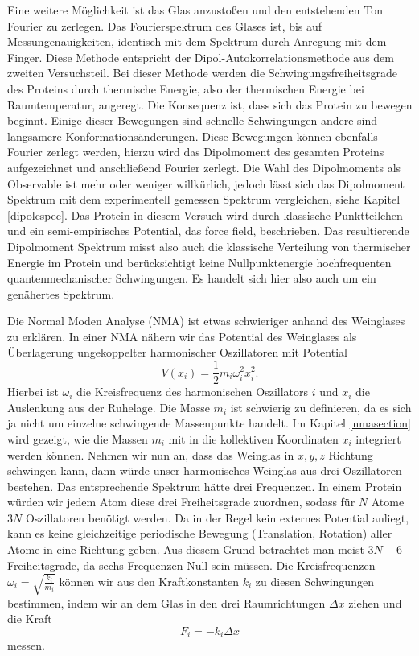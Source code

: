 \documentclass[a4paper,12pt]{article}
\begin{document}
Eine weitere Möglichkeit ist das Glas anzustoßen und den entstehenden Ton Fourier zu zerlegen. Das Fourierspektrum des Glases ist, bis auf 
Messungenauigkeiten, identisch mit dem Spektrum durch Anregung mit dem Finger. Diese Methode entspricht der Dipol-Autokorrelationsmethode aus 
dem zweiten Versuchsteil. Bei dieser Methode werden die Schwingungsfreiheitsgrade des Proteins durch thermische Energie, also der thermischen 
Energie bei Raumtemperatur, angeregt. Die Konsequenz ist, dass sich das Protein zu bewegen beginnt. Einige dieser Bewegungen sind schnelle Schwingungen 
andere sind langsamere Konformationsänderungen. Diese Bewegungen können ebenfalls Fourier zerlegt werden, hierzu wird das Dipolmoment des gesamten Proteins 
aufgezeichnet und anschließend Fourier zerlegt. Die Wahl des Dipolmoments als Observable ist mehr oder weniger willkürlich, jedoch lässt sich 
das Dipolmoment Spektrum mit dem experimentell gemessen Spektrum vergleichen, siehe Kapitel \ref{dipolespec}. Das Protein in diesem Versuch 
wird durch klassische Punktteilchen und ein semi-empirisches Potential, das force field, beschrieben. Das resultierende Dipolmoment Spektrum misst also
auch die klassische Verteilung von thermischer Energie im Protein und berücksichtigt keine Nullpunktenergie hochfrequenten quantenmechanischer 
Schwingungen. Es handelt sich hier also auch um ein genähertes Spektrum.


Die Normal Moden Analyse (NMA) ist etwas schwieriger anhand des Weinglases zu erklären. In einer NMA nähern wir das Potential des Weinglases als Überlagerung
ungekoppelter harmonischer Oszillatoren mit Potential
\begin{equation}
 V(x_i)=\frac{1}{2} m_i \omega_i^2 x_i^2.
\end{equation}
Hierbei ist $\omega_i$ die Kreisfrequenz des harmonischen Oszillators $i$ und $x_i$ die Auslenkung aus der Ruhelage. Die Masse $m_i$ ist schwierig zu definieren, 
da es sich ja nicht um einzelne schwingende Massenpunkte handelt. Im Kapitel \ref{nmasection} wird gezeigt, wie die Massen $m_i$ mit in die kollektiven Koordinaten
$x_i$ integriert werden können.
Nehmen wir nun an, dass das Weinglas in $x,y,z$ Richtung schwingen kann, dann würde unser harmonisches Weinglas aus drei Oszillatoren bestehen. Das entsprechende 
Spektrum hätte drei Frequenzen. In einem Protein würden wir jedem Atom diese drei Freiheitsgrade zuordnen, sodass für $N$ Atome $3N$ Oszillatoren benötigt werden.
Da in der Regel kein externes Potential anliegt, kann es keine gleichzeitige periodische Bewegung (Translation, Rotation) aller Atome in eine Richtung geben.
Aus diesem Grund betrachtet man meist $3N-6$ Freiheitsgrade, da sechs Frequenzen Null sein müssen. 
Die Kreisfrequenzen $\omega_i=\sqrt{\frac{k_i}{m_i}}$ können wir aus den Kraftkonstanten $k_i$ 
zu diesen Schwingungen bestimmen, indem wir an dem Glas in den drei Raumrichtungen $\Delta x$ ziehen und die Kraft 
\begin{equation}
 F_i=-k_i \Delta x
\end{equation}
messen. 
\end{document}
